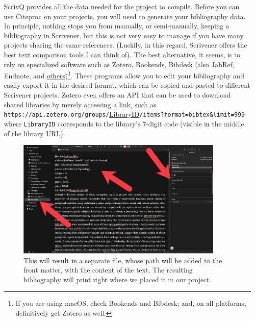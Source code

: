 \documentclass[
  12pt,
  a4paper,
  oneside,
  numbers=noenddot,
  titlepage,
  toclink=all,
  toc=bibliography]{scrbook}
\theoremstyle{definition}
\theoremstyle{definition}
\theoremstyle{definition}
\theoremstyle{plain}
\theoremstyle{plain}
\theoremstyle{plain}
\theoremstyle{plain}
\theoremstyle{plain}
\theoremstyle{remark}
\begin{document}
ScrivQ provides all the data needed for the project to compile. Before
you can use Citeproc on your projects, you will need to generate your
bibliography data. In principle, nothing stops you from manually, or
semi-manually, keeping a bibliography in Scrivener, but this is not very
easy to manage if you have many projects sharing the same references.
(Luckily, in this regard, Scrivener offers the best text comparison
tools I can think of). The best alternative, it seems, is to rely on
specialized software such as Zotero, Bookends, Bibdesk (also JabRef,
Endnote, and
\href{en.wikipedia.org/wiki/Comparison_of_reference_management_software}{others})\footnote{If
  you are using macOS, check Bookends and Bibdesk; and, on all
  platforms, definitively get Zotero as well.}. These programs allow you
to edit your bibliography and easily export it in the desired format,
which can be copied and pasted to different Scrivener projects. Zotero
even offers an API that can be used to download shared libraries by
merely accessing a link, such as
\texttt{https://api.zotero.org/groups/}\ul{LibraryID}\texttt{/items?format=bibtex\&limit=999}
where \texttt{LibraryID} corresponds to the library's 7-digit code
(visible in the middle of the library URL).

\begin{figure}

{\centering \includegraphics[width=4.02083in,height=2.30208in]{newbibliography.png}

}

\caption{\label{fig-scriv42A}This will result in a separate file, whose
path will be added to the front matter, with the content of the text.
The resulting bibliography will print right where we placed it in our
project.}

\end{figure}
\end{document}
